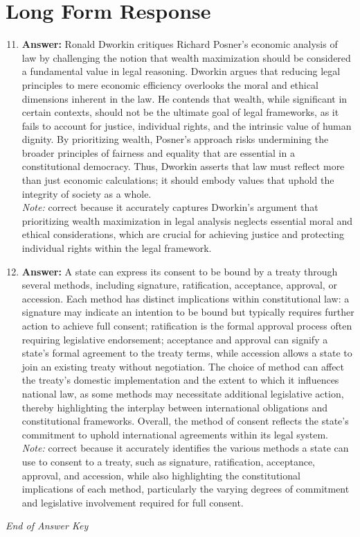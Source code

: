 \documentclass[12pt]{article}
\begin{document}
\section*{Long Form Response}
\begin{enumerate}[label=\arabic*.]
\setcounter{enumi}{10}
\item \textbf{Answer:} Ronald Dworkin critiques Richard Posner's economic analysis of law by challenging the notion that wealth maximization should be considered a fundamental value in legal reasoning. Dworkin argues that reducing legal principles to mere economic efficiency overlooks the moral and ethical dimensions inherent in the law. He contends that wealth, while significant in certain contexts, should not be the ultimate goal of legal frameworks, as it fails to account for justice, individual rights, and the intrinsic value of human dignity. By prioritizing wealth, Posner's approach risks undermining the broader principles of fairness and equality that are essential in a constitutional democracy. Thus, Dworkin asserts that law must reflect more than just economic calculations; it should embody values that uphold the integrity of society as a whole.
\\ \textit{Note:} correct because it accurately captures Dworkin's argument that prioritizing wealth maximization in legal analysis neglects essential moral and ethical considerations, which are crucial for achieving justice and protecting individual rights within the legal framework.
\item \textbf{Answer:} A state can express its consent to be bound by a treaty through several methods, including signature, ratification, acceptance, approval, or accession. Each method has distinct implications within constitutional law: a signature may indicate an intention to be bound but typically requires further action to achieve full consent; ratification is the formal approval process often requiring legislative endorsement; acceptance and approval can signify a state's formal agreement to the treaty terms, while accession allows a state to join an existing treaty without negotiation. The choice of method can affect the treaty's domestic implementation and the extent to which it influences national law, as some methods may necessitate additional legislative action, thereby highlighting the interplay between international obligations and constitutional frameworks. Overall, the method of consent reflects the state's commitment to uphold international agreements within its legal system.
\\ \textit{Note:} correct because it accurately identifies the various methods a state can use to consent to a treaty, such as signature, ratification, acceptance, approval, and accession, while also highlighting the constitutional implications of each method, particularly the varying degrees of commitment and legislative involvement required for full consent.
\end{enumerate}

\vfill
\noindent\textit{End of Answer Key}
\end{document}
